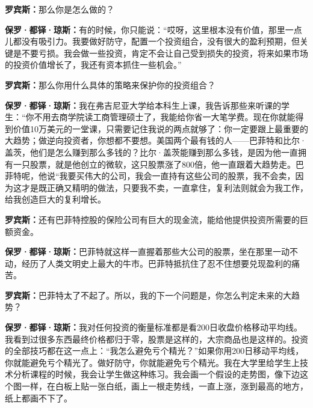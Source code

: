 \begin{BookQuote}
\textbf{罗宾斯：}那么你是怎么做的？
\end{BookQuote}

\begin{BookQuote}
\textbf{保罗·都铎·琼斯：}有的时候，你只能说：“哎呀，这里根本没有价值，那里一点儿都没有吸引力。我要做好防守，配置一个投资组合，没有很大的盈利预期，但关键是不要亏损。我会做一些投资，肯定不会让自己受到损失的投资，将来如果市场的投资价值增长了，我还有资本抓住一些机会。”
\end{BookQuote}

\begin{BookQuote}
\textbf{罗宾斯：}那么你用什么具体的策略来保护你的投资组合？
\end{BookQuote}

\begin{BookQuote}
\textbf{保罗·都铎·琼斯：}我在弗吉尼亚大学给本科生上课，我告诉那些来听课的学生：“你不用去商学院读工商管理硕士了，我能给你省一大笔学费。现在你就能得到价值10万美元的一堂课，只需要记住我说的两点就够了：你一定要跟上最重要的大趋势；做逆向投资者，你想都不要想。美国两个最有钱的人——巴菲特和比尔·盖茨，他们是怎么赚到那么多钱的？比尔·盖茨能赚到那么多钱，是因为他一直拥有一只股票，就是他创立的微软，这只股票涨了800倍，他一直跟着大趋势走。巴菲特呢，他说“我要买伟大的公司，我会一直持有这些公司的股票，我不会卖，因为这才是既正确又精明的做法，只要我不卖，一直拿住，复利法则就会为我工作，给我创造巨大的复利增长。
\end{BookQuote}

\begin{BookQuote}
\textbf{罗宾斯：}还有巴菲特控股的保险公司有巨大的现金流，能给他提供投资所需要的巨额资金。
\end{BookQuote}

\begin{BookQuote}
\textbf{保罗·都铎·琼斯：}巴菲特就这样一直握着那些大公司的股票，坐在那里一动不动，经历了人类文明史上最大的牛市。巴菲特抵抗住了忍不住想要兑现盈利的痛苦。
\end{BookQuote}

\begin{BookQuote}
\textbf{罗宾斯：}巴菲特太了不起了。所以，我的下一个问题是，你怎么判定未来的大趋势？
\end{BookQuote}

\begin{BookQuote}
\textbf{保罗·都铎·琼斯：}我对任何投资的衡量标准都是看200日收盘价格移动平均线。我看到过很多东西最终价格都归于零，股票是这样的，大宗商品也是这样的。投资的全部技巧都在这一点上：“我怎么避免亏个精光？”如果你用200日移动平均线，你就能避免亏个精光了。做好防守，你就能避免亏个精光。我在大学里给学生上技术分析课程的时候，我会让学生做这种练习。我会画一个假设的走势图，像下边这个图一样，在白板上贴一张白纸，画上一根走势线，一直上涨，涨到最高的地方，纸上都画不下了。
\end{BookQuote}

